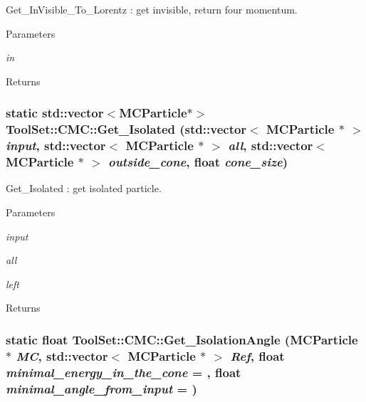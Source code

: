 Get\_\-InVisible\_\-To\_\-Lorentz : get invisible, return four momentum. 
\begin{DoxyParams}{Parameters}
\item[{\em in}]\end{DoxyParams}
\begin{DoxyReturn}{Returns}

\end{DoxyReturn}
\hypertarget{classToolSet_1_1CMC_a21929017024c827e522e120616bd6bed}{
\subsubsection[{Get\_\-Isolated}]{\setlength{\rightskip}{0pt plus 5cm}static std::vector$<$MCParticle$\ast$$>$ ToolSet::CMC::Get\_\-Isolated (std::vector$<$ MCParticle $\ast$ $>$ {\em input}, \/  std::vector$<$ MCParticle $\ast$ $>$ {\em all}, \/  std::vector$<$ MCParticle $\ast$ $>$ {\em outside\_\-cone}, \/  float {\em cone\_\-size})}}
\label{classToolSet_1_1CMC_a21929017024c827e522e120616bd6bed}


Get\_\-Isolated : get isolated particle. 
\begin{DoxyParams}{Parameters}
\item[{\em input}]\item[{\em all}]\item[{\em left}]\end{DoxyParams}
\begin{DoxyReturn}{Returns}

\end{DoxyReturn}
\hypertarget{classToolSet_1_1CMC_a507837bc0dd0238a8b44f0855e647b0c}{
\subsubsection[{Get\_\-IsolationAngle}]{\setlength{\rightskip}{0pt plus 5cm}static float ToolSet::CMC::Get\_\-IsolationAngle (MCParticle $\ast$ {\em MC}, \/  std::vector$<$ MCParticle $\ast$ $>$ {\em Ref}, \/  float {\em minimal\_\-energy\_\-in\_\-the\_\-cone} = {}, \/  float {\em minimal\_\-angle\_\-from\_\-input} = {})}}
\label{classToolSet_1_1CMC_a507837bc0dd0238a8b44f0855e647b0c}


